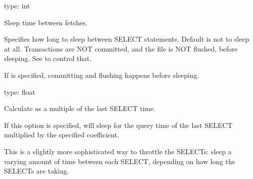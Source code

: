 \documentclass[letterpaper,10pt,english]{sphinxmanual}
\begin{document}
\begin{fulllineitems}
\label{\detokenize{mariadb-archiver:cmdoption-mariadb-archiver-sleep}}
\sphinxAtStartPar
type: int

\sphinxAtStartPar
Sleep time between fetches.

\sphinxAtStartPar
Specifies how long to sleep between SELECT statements.  Default is not to
sleep at all.  Transactions are NOT committed, and the {\hyperref[\detokenize{mariadb-archiver:cmdoption-mariadb-archiver-file}]{}} file is NOT
flushed, before sleeping.  See {\hyperref[\detokenize{mariadb-archiver:cmdoption-mariadb-archiver-txn-size}]{}} to control that.

\sphinxAtStartPar
If {\hyperref[\detokenize{mariadb-archiver:cmdoption-mariadb-archiver-commit-each}]{}} is specified, committing and flushing happens before
sleeping.

\end{fulllineitems}


\begin{fulllineitems}
\label{\detokenize{mariadb-archiver:cmdoption-mariadb-archiver-sleep-coef}}
\sphinxAtStartPar
type: float

\sphinxAtStartPar
Calculate {\hyperref[\detokenize{mariadb-archiver:cmdoption-mariadb-archiver-sleep}]{}} as a multiple of the last SELECT time.

\sphinxAtStartPar
If this option is specified,  will sleep for the query time of the
last SELECT multiplied by the specified coefficient.

\sphinxAtStartPar
This is a slightly more sophisticated way to throttle the SELECTs: sleep a
varying amount of time between each SELECT, depending on how long the SELECTs
are taking.

\end{fulllineitems}
\end{document}
